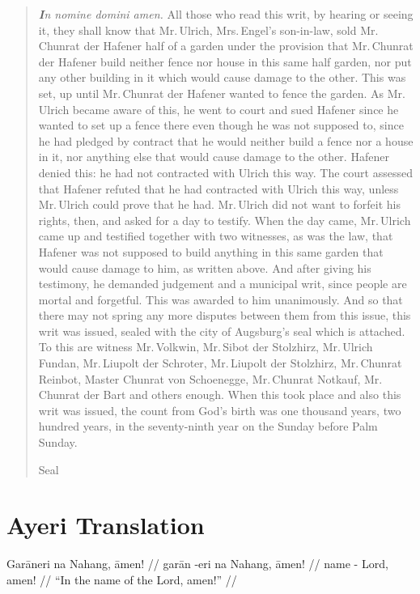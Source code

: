 \documentclass[12pt,paper=a4]{scrartcl}
\begin{document}
\blockquote{\emph{\textbf{I}n nomine domini amen.} All those who read this writ, 
by hearing or seeing it, they shall know that Mr.\,Ulrich, Mrs.\,Engel's 
son-in-law, sold Mr.\,Chunrat der Hafener half of a garden under the provision 
that Mr.\,Chunrat der Hafener build neither fence nor house in this same half 
garden, nor put any other building in it which would cause damage to the other. 
This was set, up until Mr.\,Chunrat der Hafener wanted to fence the garden. As 
Mr.\,Ulrich became aware of this, he went to court and sued Hafener since he 
wanted to set up a fence there even though he was not supposed to, since he had 
pledged by contract that he would neither build a fence nor a house in it, nor 
anything else that would cause damage to the other. Hafener denied this: he had 
not contracted with Ulrich this way. The court assessed that Hafener refuted 
that he had contracted with Ulrich this way, unless Mr.\,Ulrich could prove that 
he had. Mr.\,Ulrich did not want to forfeit his rights, then, and asked for a 
day to testify. When the day came, Mr.\,Ulrich came up and testified together 
with two witnesses, as was the law, that Hafener was not supposed to build 
anything in this same garden that would cause damage to him, as written above. 
And after giving his testimony, he demanded judgement and a municipal writ, 
since people are mortal and forgetful. This was awarded to him unanimously. And 
so that there may not spring any more disputes between them from this issue, 
this writ was issued, sealed with the city of Augsburg's seal which is attached. 
To this are witness Mr.\,Volkwin, Mr.\,Sibot der Stolzhirz, Mr.\,Ulrich Fundan, 
Mr.\,Liupolt der Schroter, Mr.\,Liupolt der Stolzhirz, Mr.\,Chunrat Reinbot, 
Master Chunrat von Schoenegge, Mr.\,Chunrat Notkauf, Mr.\,Chunrat der Bart and 
others enough. When this took place and also this writ was issued, the count 
from God's birth was one thousand years, two hundred years, in the seventy-ninth 
year on the Sunday before Palm Sunday.

\begin{center}
Seal
\end{center}}

\section{Ayeri Translation}


\ex \begingl
	\glpreamble Garāneri na Nahang, āmen! //
	\gla garān -eri na Nahang, āmen! //
	\glb name -\Ins{} \Gen{} Lord, amen! //
	\glft \enquote{In the name of the Lord, amen!} //
\endgl \xe
\end{document}
